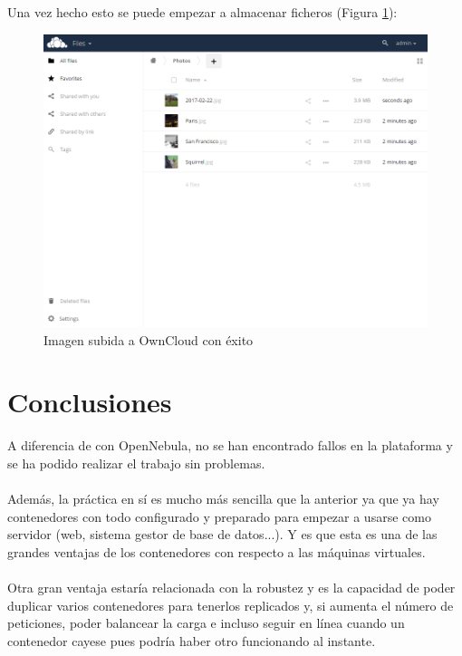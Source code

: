 Una vez hecho esto se puede empezar a almacenar ficheros (Figura \ref{fig:owncloud-uploaded-file}):

\begin{figure}[H]
	\centering
	\includegraphics[width=14cm]{img/owncloud-uploaded-file}
	\caption{Imagen subida a OwnCloud con éxito}
	\label{fig:owncloud-uploaded-file}
\end{figure}

\section{Conclusiones}

A diferencia de con OpenNebula, no se han encontrado fallos en la plataforma y se ha podido realizar el trabajo sin problemas.
\\ \\
Además, la práctica en sí es mucho más sencilla que la anterior ya que ya hay contenedores con todo configurado y preparado para empezar a usarse como servidor (web, sistema gestor de base de datos...). Y es que esta es una de las grandes ventajas de los contenedores con respecto a las máquinas virtuales.
\\ \\
Otra gran ventaja estaría relacionada con la robustez y es la capacidad de poder duplicar varios contenedores para tenerlos replicados y, si aumenta el número de peticiones, poder balancear la carga e incluso seguir en línea cuando un contenedor cayese pues podría haber otro funcionando al instante.


\newpage


